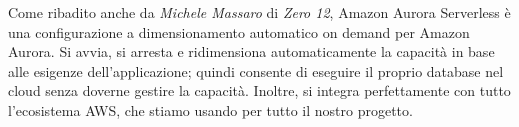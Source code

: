 Come ribadito anche da \textit{Michele Massaro} di \textit{Zero 12}, Amazon Aurora Serverless è una configurazione a dimensionamento automatico on demand per Amazon Aurora. Si avvia, si arresta e ridimensiona automaticamente la capacità in base alle esigenze dell'applicazione; quindi consente di eseguire il proprio database nel cloud senza doverne gestire la capacità. Inoltre, si integra perfettamente con tutto l'ecosistema AWS, che stiamo usando per tutto il nostro progetto.


